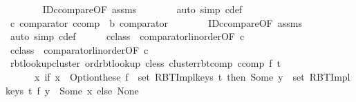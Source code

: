 \begin{isabellebody}
\ \ \ \ \ \ \isamarkupfalse%
\ ID{\isacharunderscore}{\kern0pt}ccompare{\isacharprime}{\kern0pt}{\isacharbrackleft}{\kern0pt}OF\ assms{\isacharparenleft}{\kern0pt}{}{\isacharparenright}{\kern0pt}{\isacharbrackright}{\kern0pt}\isanewline
\ \ \ \ \ \ \isamarkupfalse%
\ {\isacharparenleft}{\kern0pt}auto\ simp{\isacharcolon}{\kern0pt}\ c{\isacharunderscore}{\kern0pt}def{\isacharparenright}{\kern0pt}\isanewline
\ \ \ \ \isamarkupfalse%
\ c{\isacharprime}{\kern0pt}{\isacharcolon}{\kern0pt}\ {\isachardoublequoteopen}comparator\ {\isacharparenleft}{\kern0pt}ccomp\ {\isacharcolon}{\kern0pt}{\isacharcolon}{\kern0pt}\ {\isacharprime}{\kern0pt}b\ comparator{\isacharparenright}{\kern0pt}{\isachardoublequoteclose}\isanewline
\ \ \ \ \ \ \isamarkupfalse%
\ ID{\isacharunderscore}{\kern0pt}ccompare{\isacharprime}{\kern0pt}{\isacharbrackleft}{\kern0pt}OF\ assms{\isacharparenleft}{\kern0pt}{}{\isacharparenright}{\kern0pt}{\isacharbrackright}{\kern0pt}\isanewline
\ \ \ \ \ \ \isamarkupfalse%
\ {\isacharparenleft}{\kern0pt}auto\ simp{\isacharcolon}{\kern0pt}\ c{\isacharprime}{\kern0pt}{\isacharunderscore}{\kern0pt}def{\isacharparenright}{\kern0pt}\isanewline
\ \ \ \ \isamarkupfalse%
\ c{\isacharunderscore}{\kern0pt}class\ {\isacharequal}{\kern0pt}\ comparator{\isachardot}{\kern0pt}linorder{\isacharbrackleft}{\kern0pt}OF\ c{\isacharbrackright}{\kern0pt}\isanewline
\ \ \ \ \isamarkupfalse%
\ c{\isacharprime}{\kern0pt}{\isacharunderscore}{\kern0pt}class\ {\isacharequal}{\kern0pt}\ comparator{\isachardot}{\kern0pt}linorder{\isacharbrackleft}{\kern0pt}OF\ c{\isacharprime}{\kern0pt}{\isacharbrackright}{\kern0pt}\isanewline
\ \ \ \ \isamarkupfalse%
\ rbt{\isacharunderscore}{\kern0pt}lookup{\isacharunderscore}{\kern0pt}cluster{\isacharcolon}{\kern0pt}\ {\isachardoublequoteopen}ord{\isachardot}{\kern0pt}rbt{\isacharunderscore}{\kern0pt}lookup\ cless\ {\isacharparenleft}{\kern0pt}cluster{\isacharunderscore}{\kern0pt}rbt{\isacharunderscore}{\kern0pt}comp\ ccomp\ f\ t{\isacharparenright}{\kern0pt}\ {\isacharequal}{\kern0pt}\isanewline
\ \ \ \ \ \ {\isacharparenleft}{\kern0pt}{\isasymlambda}x{\isachardot}{\kern0pt}\ if\ x\ {\isasymin}\ Option{\isachardot}{\kern0pt}these\ {\isacharparenleft}{\kern0pt}f\ {\isacharbackquote}{\kern0pt}\ {\isacharparenleft}{\kern0pt}set\ {\isacharparenleft}{\kern0pt}RBT{\isacharunderscore}{\kern0pt}Impl{\isachardot}{\kern0pt}keys\ t{\isacharparenright}{\kern0pt}{\isacharparenright}{\kern0pt}{\isacharparenright}{\kern0pt}\ then\ Some\ {\isacharbraceleft}{\kern0pt}y\ {\isasymin}\ {\isacharparenleft}{\kern0pt}set\ {\isacharparenleft}{\kern0pt}RBT{\isacharunderscore}{\kern0pt}Impl{\isachardot}{\kern0pt}keys\ t{\isacharparenright}{\kern0pt}{\isacharparenright}{\kern0pt}{\isachardot}{\kern0pt}\ f\ y\ {\isacharequal}{\kern0pt}\ Some\ x{\isacharbraceright}{\kern0pt}\ else\ None{\isacharparenright}{\kern0pt}{\isachardoublequoteclose}\isanewline

\end{isabellebody}
